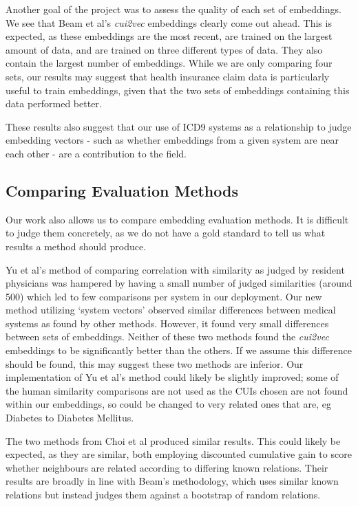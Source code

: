 \documentclass[11pt,a4paper]{article}
\begin{document}
Another goal of the project was to assess the quality of each set of embeddings. We see that Beam et al's \emph{cui2vec} embeddings clearly come out ahead. This is expected, as these embeddings are the most recent, are trained on the largest amount of data, and are trained on three different types of data. They also contain the largest number of embeddings. While we are only comparing four sets, our results may suggest that health insurance claim data is particularly useful to train embeddings, given that the two sets of embeddings containing this data performed better. 

These results also suggest that our use of ICD9 systems as a relationship to judge embedding vectors - such as whether embeddings from a given system are near each other - are a contribution to the field. 


\subsection{Comparing Evaluation Methods}
Our work also allows us to compare embedding evaluation methods. It is difficult to judge them concretely, as we do not have a gold standard to tell us what results a method should produce.

Yu et al's method of comparing correlation with similarity as judged by resident physicians was hampered by having a small number of judged similarities (around 500) which led to few comparisons per system in our deployment. Our new  method utilizing `system vectors' observed similar differences between medical systems as found by other methods. However, it found very small differences between sets of embeddings. Neither of these two methods found the \emph{cui2vec} embeddings to be significantly better than the others. If we assume this difference should be found, this may suggest these two methods are inferior. Our implementation of Yu et al's method could likely be slightly improved; some of the human similarity comparisons are not used as the CUIs chosen are not found within our embeddings, so could be changed to very related ones that are, eg Diabetes to Diabetes Mellitus.  

The two methods from Choi et al produced similar results. This could likely be expected, as they are similar, both employing discounted cumulative gain to score whether neighbours are related according to differing known relations. Their results are broadly in line with Beam's methodology, which uses similar known relations but instead judges them against a bootstrap of random relations. 
\end{document}
